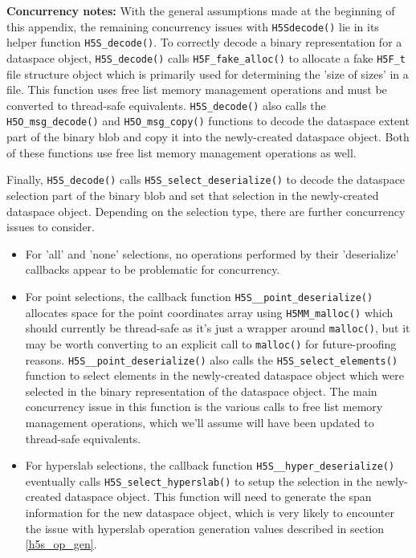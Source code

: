 \documentclass[../HDF5_RFC.tex]{subfiles}
\begin{document}
\textbf{Concurrency notes:} With the general assumptions made at the beginning of this
appendix, the remaining concurrency issues with \texttt{H5Sdecode()} lie in its helper
function \texttt{H5S\_decode()}. To correctly decode a binary representation for a dataspace
object, \texttt{H5S\_decode()} calls \texttt{H5F\_fake\_alloc()} to allocate a fake
\texttt{H5F\_t} file structure object which is primarily used for determining the 'size of
sizes' in a file. This function uses free list memory management operations and must be converted
to thread-safe equivalents. \texttt{H5S\_decode()} also calls the \texttt{H5O\_msg\_decode()}
and \texttt{H5O\_msg\_copy()} functions to decode the dataspace extent part of the binary blob
and copy it into the newly-created dataspace object. Both of these functions use free list
memory management operations as well.

Finally, \texttt{H5S\_decode()} calls \texttt{H5S\_select\_deserialize()} to decode the dataspace
selection part of the binary blob and set that selection in the newly-created dataspace object.
Depending on the selection type, there are further concurrency issues to consider.

\begin{itemize}
    \item For 'all' and 'none' selections, no operations performed by their 'deserialize' callbacks
          appear to be problematic for concurrency.
    \item For point selections, the callback function \texttt{H5S\_\_point\_deserialize()} allocates
          space for the point coordinates array using \texttt{H5MM\_malloc()} which should currently
          be thread-safe as it's just a wrapper around \texttt{malloc()}, but it may be worth
          converting to an explicit call to \texttt{malloc()} for future-proofing reasons.
          \texttt{H5S\_\_point\_deserialize()} also calls the \texttt{H5S\_select\_elements()} function
          to select elements in the newly-created dataspace object which were selected in the binary representation of the dataspace object. The main concurrency issue in this function is the
          various calls to free list memory management operations, which we'll assume will have been
          updated to thread-safe equivalents.
    \item For hyperslab selections, the callback function \texttt{H5S\_\_hyper\_deserialize()} eventually
          calls \texttt{H5S\_select\_hyperslab()} to setup the selection in the newly-created dataspace
          object. This function will need to generate the span information for the new dataspace object,
          which is very likely to encounter the issue with hyperslab operation generation values described
          in section \ref{h5s_op_gen}.
\end{itemize}
\end{document}
